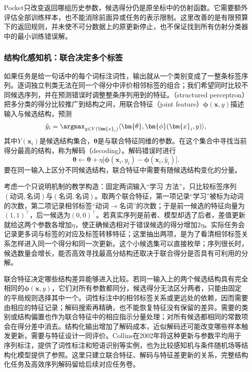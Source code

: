 Pocket只改变返回哪组历史参数，候选得分仍是原坐标中的仿射函数。它需要额外评估全部训练样本，也不能消除前面异或任务的表示限制。这里改善的是有限预算下的返回规则，并未使不可分数据上的原更新停止，也不保证找到所有仿射分类器中的最小训练错误解。

\subsubsection{结构化感知机：联合决定多个标签}
\label{sec:classification-structured-perceptron}

如果任务是给一句话中的每个词标注词性，输出就从一个类别变成了一整条标签序列。逐词独立判类无法在同一个得分中评价相邻标签的组合；我们希望同时比较不同候选序列，并在预测错误时调整整条序列用到的特征。（structured perceptron）把多分类的得分比较推广到结构之间，用联合特征（joint feature）$\bm{\phi}(\bm{x},y)$描述输入与候选结构，预测
\[
  \hat y_i=\argmax_{y\in Y(\bm{x}_i)}
    \langle\bm{\theta},\bm{\phi}(\bm{x}_i,y)\rangle ,
\]
其中$Y(\bm{x}_i)$是候选结构集合，$\bm{\theta}$是与联合特征同维的参数。在这个集合中寻找当前得分最高的结构，称为解码（decoding）。解码错误时进行
\[
  \bm{\theta}\leftarrow\bm{\theta}
    +\eta\bigl[\bm{\phi}(\bm{x}_i,y_i)
      -\bm{\phi}(\bm{x}_i,\hat y_i)\bigr].
\]
要在同一输入上区分不同候选结构，联合特征中需要有随候选结构变化的分量。

考虑一个只说明机制的教学构造：固定两词输入“学习 方法”，只比较标签序列$(\text{动词},\text{名词})$与$(\text{名词},\text{名词})$。取两个联合特征，第一项记录“学习”被标为动词的次数，第二项记录相邻标签“动词$\to$名词”的次数；于是前一候选的特征向量为$(1,1)^\top$，后一候选为$(0,0)^\top$。若真实序列是前者、模型却选了后者，差值更新就给这两个参数各增加$\eta$，使正确候选相对于错误候选的得分增加$2\eta$。实际任务会记录更多词与标签的对应及标签转移特征；这里抽出两项，是为了看清相邻标签关系怎样进入同一个得分和同一次更新。这个小候选集可以直接枚举；序列很长时，候选数量会增长，能否高效寻找最高分结构还取决于联合得分是否具有可利用的分解。

联合特征决定哪些结构差异能够进入比较。若同一输入上的两个候选结构具有完全相同的$\bm\phi(\bm x,y)$，它们对所有参数都同分，候选得分无法区分两者，只能由固定的平局规则选择其中一个。词性标注中的相邻标签关系或更远处的依赖，因而需要由相应的特征记录；解码搜索再精确，也不能恢复特征没有保留的差异。需要的类别或结构偏置也作为联合特征中的相应指示分量处理；对所有候选都相同的常数项会在得分差中消去。结构化输出增加了解码成本，近似解码还可能改变哪些样本触发更新，需要与特征设计一同评价。Collins在2002年将这种更新与参数平均用于序列标注，提供了词性标注和短语识别等实例，也为比较感知机与条件随机场等结构化模型提供了参照。这里只建立联合特征、解码与特征差更新的关系，完整结构化任务及高效序列解码留给后续对应任务卷。
